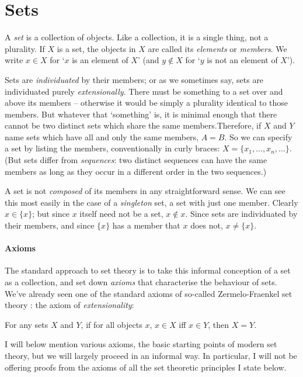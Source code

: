 

\section{Sets}

A \emph{set} is a collection of objects. Like a collection, it is a single thing, not a plurality. If $X$ is a set, the objects in $X$ are called its \emph{elements} or \emph{members}. We write $x \in X$ for `$x$ is an element of $X$' (and $y \notin X$ for `$y$ is not an element of $X$').

 Sets are \emph{individuated} by their members; or as we sometimes say, sets are individuated purely \emph{extensionally}. There must be something to a set over and above its members – otherwise it would be simply a plurality identical to those members. But whatever that ‘something’ is, it is minimal enough that there cannot be two distinct sets which share the same members.Therefore, if $X$ and $Y$ name sets which have all and only the same members, $A = B$. So we can specify a set by listing the members, conventionally in curly braces: $X = \{x_{1},...,x_{n},…\}$. (But sets differ from \emph{sequences}: two distinct sequences can have the same members as long as they occur in a different order in the two sequences.)

A set is not \emph{composed} of its members in any straightforward sense. We can see this most easily in the case of a \emph{singleton} set, a set with just one member. Clearly $x \in \{x\}$; but since $x$ itself need not be a set, $x \notin x$. Since sets are individuated by their members, and since $\{x\}$ has a member that $x$ does not, $x\neq\{x\}$.

\paragraph{Axioms} The standard approach to set theory is to take this informal conception of a set as a collection, and set down \emph{axioms} that characterise the behaviour of sets. We've already seen one of the standard axioms of so-called Zermelo-Fraenkel set theory : the axiom of \emph{extensionality}: \begin{axiom}[Extensionality]
  For any sets $X$ and $Y$, if for all objects $x$, $x\in X$ iff $x\in Y$, then $X=Y$.
\end{axiom} I will below mention various axioms, the basic starting points of modern set theory, but we will largely proceed in an informal way. In particular, I will not be offering proofs from the axioms of all the set theoretic principles I state below.

